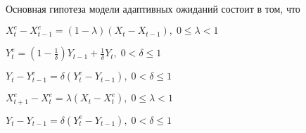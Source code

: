 
\begin{question}
Основная гипотеза модели адаптивных ожиданий состоит в том, что
\begin{answerlist}[2]
  \item \(X_t^e - X_{t-1}^e = (1-\lambda) (X_t - X_{t-1}), \; 0 \leq \lambda < 1\)
  \item \(Y_t^e = \left(1 - \frac{1}{\delta}\right) Y_{t-1} + \frac{1}{\delta} Y_{t}, \; 0 < \delta \leq 1\)
  \item \(Y_t - Y_{t-1}^e = \delta (Y_t^e - Y_{t-1}), \; 0 < \delta \leq 1\)
  \item \(X_{t+1}^e - X_{t}^e = \lambda (X_{t} - X_{t}^e), \; 0 \leq \lambda < 1\)
  \item \(Y_t - Y_{t-1} = \delta (Y_t^e - Y_{t-1}), \; 0 < \delta \leq 1\)
\end{answerlist}
\end{question}


